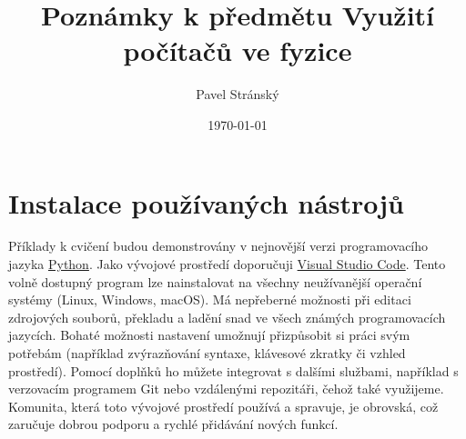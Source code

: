 \documentclass[a4paper,11pt,twoside]{article}
\theoremstyle{red}
\theoremstyle{green}
\begin{document}
\theoremstyle{spaced}
\newtheorem{example}{Příklad}[section]

\theoremstyle{blue}
\newtheorem{solution}{Řešení}[section]

\title{Poznámky k předmětu Využití počítačů ve fyzice}
\date{\today}
\author{Pavel Stránský}

\maketitle
\tableofcontents

\newcommand{\sectionbreak}{\clearpage}

\section{Instalace používaných nástrojů}
\label{sec:Instalace}
    Příklady k cvičení budou demonstrovány v nejnovější verzi programovacího jazyka \href{https://python.org}{Python}.
    Jako vývojové prostředí doporučuji \href{https://code.visualstudio.com}{Visual Studio Code}.
    Tento volně dostupný program lze nainstalovat na všechny neužívanější operační systémy (Linux, Windows, macOS).    
    Má nepřeberné možnosti při editaci zdrojových souborů, překladu a ladění snad ve všech známých programovacích jazycích.
    Bohaté možnosti nastavení umožnují přizpůsobit si práci svým potřebám (například zvýrazňování syntaxe, klávesové zkratky či vzhled prostředí).
    Pomocí doplňků ho můžete integrovat s dalšími službami, například s verzovacím programem Git nebo vzdálenými repozitáři, čehož také využijeme.
    Komunita, která toto vývojové prostředí používá a spravuje, je obrovská, což zaručuje dobrou podporu a rychlé přidávání nových funkcí.
\end{document}
